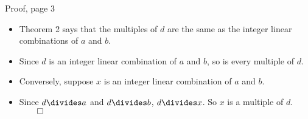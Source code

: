 \documentclass[handout]{beamer}
\begin{document}

\begin{frame}{Proof, page 3}

\begin{itemize}
  \item Theorem 2 says that the multiples of $d$ are the same as the integer linear combinations of $a$ and $b$.
  \item Since $d$ is an integer linear combination of $a$ and $b$, so is every multiple of $d$.
  \item Conversely, suppose $x$ is an integer linear combination of $a$ and $b$.
  \item Since $d\divides a$ and $d\divides b$, $d\divides x$. So $x$ is a multiple of $d$. $\qed$
\end{itemize}

\end{frame}

\end{document}
